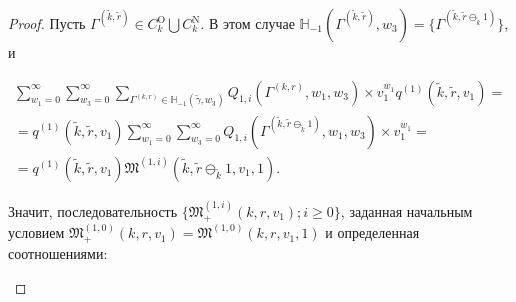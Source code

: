 \documentclass[a4paper,twoside]{article}
\theoremstyle{theorem}
\theoremstyle{remark}
\begin{document}
\begin{proof}
Пусть $\Gamma^{(\tilde{k},\tilde{r})}\in C_k^{\mathrm{O}} \bigcup C_k^{\mathrm{N}}$. В этом случае ${\mathbb H}_{-1}(\Gamma^{(\tilde{k},\tilde{r})}, w_3) = \{\Gamma^{(\tilde{k},\tilde{r}\ominus_{\tilde{k}} 1)}\}$, и

\begin{multline*}
 \sum_{w_1=0}^{\infty}\sum_{w_3=0}^{\infty} \sum_{\Gamma^{(k,r)} \in {\mathbb H}_{-1}(\tilde{\gamma},w_3)} Q_{1,i}(\Gamma^{(k,r)},w_1,w_3)  \times  v_1^{w_1} q^{(1)}(\tilde{k},\tilde{r},v_1) = \\ = q^{(1)}(\tilde{k},\tilde{r},v_1)  \sum_{w_1=0}^{\infty}\sum_{w_3=0}^{\infty}  Q_{1,i}(\Gamma^{(\tilde{k},\tilde{r}\ominus_{\tilde{k}} 1)},w_1,w_3)  \times  v_1^{w_1} = \\ =
 q^{(1)}(\tilde{k},\tilde{r},v_1)  \mathfrak{M}^{(1,i)}(\tilde{k},\tilde{r}\ominus_{\tilde{k}} 1,v_1,1).
\end{multline*}

Значит, последовательность $\{\mathfrak{M}_+^{(1,i)}(k,r,v_1); i\geqslant 0\}$, заданная начальным условием $\mathfrak{M}_+^{(1,0)}(k,r,v_1)=\mathfrak{M}^{(1,0)}(k,r,v_1,1)$ и  определенная соотношениями:
\begin{enumerate}[ 1{)} ]


\end{enumerate}
\end{proof}
\end{document}
